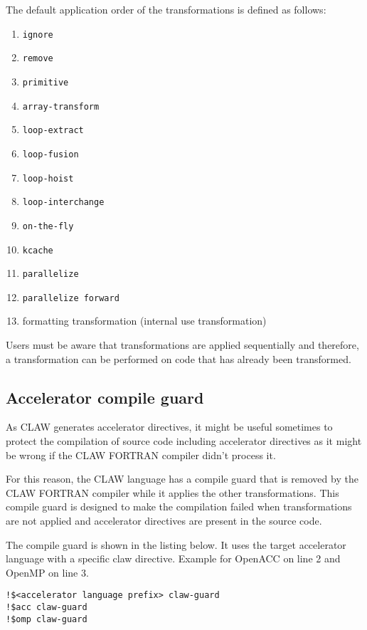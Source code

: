 \documentclass{article}
\begin{document}
The default application order of the transformations is defined as follows:

\begin{enumerate}
\item \lstinline!ignore!
\item \lstinline!remove!
\item \lstinline!primitive!
\item \lstinline!array-transform!
\item \lstinline!loop-extract!
\item \lstinline!loop-fusion!
\item \lstinline!loop-hoist!
\item \lstinline!loop-interchange!
\item \lstinline!on-the-fly!
\item \lstinline!kcache!
\item \lstinline!parallelize!
\item \lstinline!parallelize forward!
\item formatting transformation (internal use transformation)
\end{enumerate}

Users must be aware that transformations are applied sequentially and
therefore, a transformation can be performed on code that has already been transformed.

\subsection{Accelerator compile guard}
As CLAW generates accelerator directives, it might be useful sometimes to protect the compilation of source code including accelerator directives as it might be wrong if the CLAW FORTRAN compiler didn't process it. 

For this reason, the CLAW language has a compile guard that is removed by the CLAW FORTRAN compiler while it applies the other transformations. This compile guard is designed to make the compilation failed when transformations are not applied and accelerator directives are present in the source code. 

The compile guard is shown in the listing below. It uses the target accelerator language with a specific claw directive. Example for OpenACC on line 2 and OpenMP on line 3. 

\begin{lstlisting}
!$<accelerator language prefix> claw-guard 
!$acc claw-guard
!$omp claw-guard
\end{lstlisting}
\end{document}
